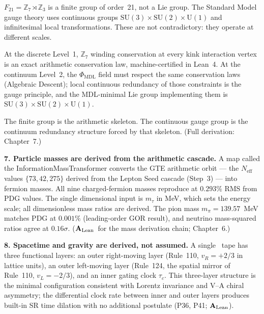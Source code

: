 \documentclass[11pt,openany]{book}
\theoremstyle{remark}
\newcommand{\PHIMDL}{\Phi_{\mathrm{MDL}}}
\newcommand{\CMCA}{\text{CMCA}}
\newcommand{\CatAL}{\ensuremath{\textbf{A}_{\rm Lean}}}
\begin{document}
\begin{tcolorbox}[colback=orange!4,colframe=orange!55!black,
  title={\textbf{How a Finite Group Produces Continuous Gauge Symmetry}},
  fonttitle=\small\bfseries, left=6pt, right=6pt, top=4pt, bottom=4pt]
\small
$F_{21} = \mathbb{Z}_7\rtimes\mathbb{Z}_3$ is a finite group of order~21, not a
Lie group.
The Standard Model gauge theory uses continuous groups
$\mathrm{SU}(3)\times\mathrm{SU}(2)\times\mathrm{U}(1)$ and infinitesimal local
transformations.
These are not contradictory: they operate at different scales.

At the discrete Level~1, $\mathbb{Z}_7$ winding conservation at every kink interaction
vertex is an exact arithmetic conservation law, machine-certified in Lean~4.
At the continuum Level~2, the $\PHIMDL$ field must respect the same conservation laws
(Algebraic Descent); local continuous redundancy of those constraints is the gauge
principle, and the MDL-minimal Lie group implementing them is
$\mathrm{SU}(3)\times\mathrm{SU}(2)\times\mathrm{U}(1)$.

\smallskip\noindent
The finite group is the arithmetic skeleton.
The continuous gauge group is the continuum redundancy structure forced by that skeleton.
(Full derivation: Chapter~7.)
\end{tcolorbox}

\medskip

\textbf{7. Particle masses are derived from the arithmetic cascade.}
A map called the InformationMassTransformer converts the GTE arithmetic
orbit --- the $N_\mathrm{eff}$ values $\{73,42,275\}$ derived from the
Lepton Seed cascade (Step~3) --- into fermion masses.
All nine charged-fermion masses reproduce at $0.293\%$ RMS from PDG values.
The single dimensional input is $m_\tau$ in MeV, which sets the energy scale;
all dimensionless mass ratios are derived.
The pion mass $m_\pi = 139.57$~MeV matches PDG at $0.001\%$ (leading-order GOR
result), and neutrino mass-squared ratios agree at $0.16\sigma$.
(\CatAL\ for the mass derivation chain; Chapter~6.)

\medskip

\textbf{8. Spacetime and gravity are derived, not assumed.}
A single \CMCA\ tape has three functional layers: an outer right-moving
layer (Rule~110, $v_R = +2/3$ in lattice units), an outer left-moving layer
(Rule~124, the spatial mirror of Rule~110, $v_L = -2/3$), and an inner
gating clock $\tau_c$.
This three-layer structure is the minimal configuration consistent with
Lorentz invariance and V--A chiral asymmetry; the differential clock rate
between inner and outer layers produces built-in SR time dilation with
no additional postulate (P36, P41; \CatAL).
\end{document}
